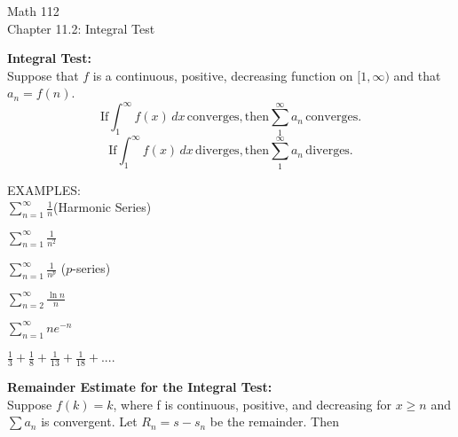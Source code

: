 \documentclass[11pt]{article}
\begin{document}
\begin{center}
\Large
\rm{Math 112}
\\
\rm{Chapter 11.2:  Integral Test}
\\
\end{center}
\vspace{0.2in}

{\bf Integral Test:}  \\
Suppose that $f$ is a continuous, positive, decreasing function on $[1,\infty)$
  and that $a_n = f(n)$.
  \begin{displaymath}
\mbox{If} \int_1^{\infty}f(x)\, dx \, \mbox{converges}, \mbox{then} \sum_1^{\infty}a_n \, \mbox{converges.}
      \end{displaymath}
  \begin{displaymath}
\mbox{If} \int_1^{\infty}f(x)\, dx \, \mbox{diverges}, \mbox{then} \sum_1^{\infty}a_n \, \mbox{diverges.}
      \end{displaymath}

  \vspace{0.5in}

  EXAMPLES:\\

$\sum_{n=1}^{\infty} \frac{1}{n}$\quad (Harmonic Series)

\pagebreak

$\sum_{n=1}^{\infty}  \frac{1}{n^2}$

\vspace{3.5in}

$\sum_{n=1}^{\infty}  \frac{1}{n^p}$ \quad ($p$-series)\\

\vspace{1in}

$\sum_{n=2}^{\infty} \frac{\ln{n}}{n} $

\pagebreak

$\sum_{n=1}^{\infty} ne^{-n} $

\vspace{2in}

$\frac13 + \frac18 + \frac{1}{13} + \frac{1}{18} + ....$

\vspace{2in}

{\bf Remainder Estimate for the Integral Test:}  \\

Suppose $f(k)=k$, where f is continuous, positive, and decreasing for $x\ge n$ and $\sum a_n$ is convergent.
Let $R_n = s - s_n$ be the remainder. Then
\end{document}
